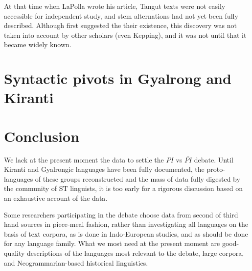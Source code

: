 \documentclass[oldfontcommands,oneside,a4paper,11pt]{article}
\begin{document}
At that time when LaPolla wrote his article, Tangut texts were not easily accessible for independent study, and stem alternations had not yet been fully described. Although \citet{nishida75} first suggested the their existence, this discovery was not taken into account by other scholars (even Kepping), and it was not until \citet{gong01huying} that it became widely known. 
 


\section{Syntactic pivots in Gyalrong and Kiranti}

\section{Conclusion}

We lack at the present moment the data to settle the $PI$ vs $\overline{PI}$ debate. Until Kiranti and Gyalrongic languages have been fully documented, the proto-languages of these groups reconstructed and the mass of data fully digested by the community of ST linguists, it is too early for a rigorous discussion based on an exhaustive account of the data. 

Some researchers participating in the debate choose data from second of third hand sources in piece-meal fashion, rather than investigating all languages on the basis of text corpora, as is done in Indo-European studies, and as should be done for any language family. What we most need at the present moment are good-quality descriptions of the languages most relevant to the debate, large corpora, and Neogrammarian-based historical linguistics.



\end{document}
